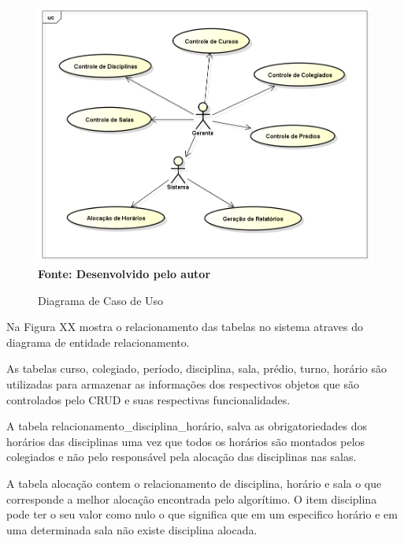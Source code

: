 \begin{figure}[!htb]
\caption[Diagrama de Caso de Uso]{Diagrama de Caso de Uso}
\label{fig:figura1}
\centering
\includegraphics[scale=0.4]{imagens/diagramaCasoUso.png}
\\ \textbf{\footnotesize Fonte: Desenvolvido pelo autor}
\end{figure}


Na Figura XX mostra o relacionamento das tabelas no sistema atraves do diagrama de entidade relacionamento.\par

As tabelas curso, colegiado, período, disciplina, sala, prédio, turno, horário são utilizadas para armazenar as informações dos respectivos objetos que são controlados pelo CRUD e suas respectivas funcionalidades.\par

A tabela relacionamento\_disciplina\_horário, salva as obrigatoriedades dos horários das disciplinas uma vez que todos os horários são montados pelos colegiados e não pelo responsável pela alocação das disciplinas nas salas.\par

A tabela alocação contem o relacionamento de disciplina, horário e sala o que corresponde a melhor alocação encontrada pelo algorítimo. O item disciplina pode ter o seu valor como nulo o que significa que em um especifico horário e em uma determinada sala não existe disciplina alocada.\par

